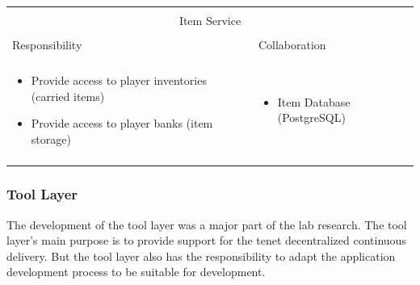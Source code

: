 \vspace{0.5cm} \noindent 
\begin{tabular}{|l|l|}
    \cline{1-2}
    \multicolumn{2}{|c|}{} \\[-0.3cm]
    \multicolumn{2}{|c|}{Item Service} \\ 
    \multicolumn{2}{|c|}{} \\[-0.3cm]
    \cline{1-2}
    Responsibility & Collaboration \\
    \cline{1-2}
    & \\[-0.2cm]
    \begin{minipage}{0.47\textwidth}
        \begin{itemize}
          \item Provide access to player inventories (carried items)
          \item Provide access to player banks (item storage)
        \end{itemize} 
    \end{minipage}
	&
    \begin{minipage}{0.47\textwidth}
        \begin{itemize}
          \item Item Database (PostgreSQL)
        \end{itemize} 
    \end{minipage}
	\\ & \\
    \hline
\end{tabular}

\subsubsection{Tool Layer}

The development of the tool layer was a major part of the lab research. The tool
layer's main purpose is to provide support for the tenet decentralized
continuous delivery. But the tool layer also has the responsibility to adapt the
\ms{} application development process to be suitable for \og{} development.\\

